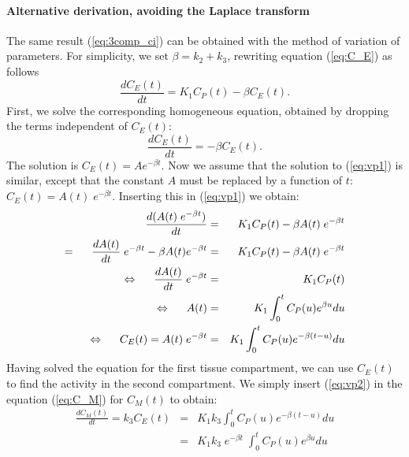 \paragraph{Alternative derivation, avoiding the Laplace transform\\}
The same result (\ref{eq:3comp_ci}) can be obtained with the method of
variation of parameters.
For simplicity, we set $\beta = k_2 + k_3$,
rewriting equation (\ref{eq:C_E}) as follows
\begin{equation}
   \frac{dC_E(t)}{dt}  =  K_1 C_P(t) - \beta C_E(t). \label{eq:vp1}
\end{equation}
First, we solve the corresponding homogeneous equation, obtained by
dropping the terms independent of $C_E(t)$:
\begin{equation}
   \frac{dC_E(t)}{dt}  =  - \beta C_E(t).
\end{equation}
The solution is $C_E(t) = A e^{-\beta t}$. Now we assume that the
solution to (\ref{eq:vp1}) is similar, except that the constant $A$
must be replaced by a function of $t$: $C_E(t) = A(t) \; e^{-\beta
t}$. Inserting this in (\ref{eq:vp1}) we obtain:
\begin{eqnarray}
   \frac{d ( A(t) \; e^{-\beta t})}{dt} 
             &=&  K_1 C_P(t) - \beta A(t) \; e^{-\beta t}\\
 = \hspace{5mm} 
   \frac{d A(t)}{dt} \; e^{-\beta t} - \beta A(t) e^{-\beta t} 
              &=& K_1 C_P(t) - \beta A(t) \; e^{-\beta t}\\
\Leftrightarrow  \hspace{5mm} 
   \frac{d A(t)}{dt} \; e^{-\beta t} &=& K_1 C_P(t)\\
\Leftrightarrow  \hspace{5mm} 
   A(t) &=& K_1 \int_0^t C_P(u) e^{\beta u} du\\
\Leftrightarrow  \hspace{5mm} 
   C_E(t) = A(t)  \; e^{-\beta t}
      &=& K_1 \int_0^t C_P(u) e^{- \beta (t -u)} du \label{eq:vp2}
\end{eqnarray}
%
Having solved the equation for the first tissue compartment, we can
use $C_E(t)$ to find the activity in the second compartment.  We
simply insert (\ref{eq:vp2}) in the equation (\ref{eq:C_M}) for
$C_M(t)$ to obtain:
\begin{eqnarray}
  \frac{d C_M(t)}{dt} = k_3 C_E(t) 
    &=& K_1 k_3 \int_0^t C_P(u) e^{- \beta (t -u)} du \nonumber\\
    &=& K_1 k_3 \; e^{- \beta t} \; \int_0^t C_P(u) e^{\beta u} du
\end{eqnarray}
